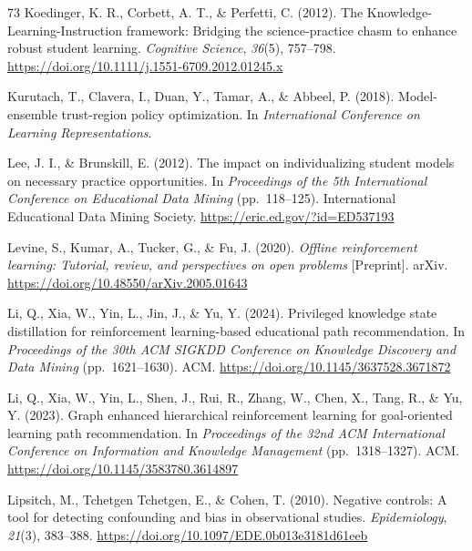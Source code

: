 \documentclass[a4paper,preprint,12pt,authoryear]{elsarticle}
\begin{document}
\begin{thebibliography}{73}
Koedinger, K. R., Corbett, A. T., \& Perfetti, C. (2012). The Knowledge-Learning-Instruction framework: Bridging the science-practice chasm to enhance robust student learning. \textit{Cognitive Science}, \textit{36}(5), 757--798. \url{https://doi.org/10.1111/j.1551-6709.2012.01245.x}

Kurutach, T., Clavera, I., Duan, Y., Tamar, A., \& Abbeel, P. (2018). Model-ensemble trust-region policy optimization. In \textit{International Conference on Learning Representations}.

Lee, J. I., \& Brunskill, E. (2012). The impact on individualizing student models on necessary practice opportunities. In \textit{Proceedings of the 5th International Conference on Educational Data Mining} (pp.~118--125). International Educational Data Mining Society. \url{https://eric.ed.gov/?id=ED537193}

Levine, S., Kumar, A., Tucker, G., \& Fu, J. (2020). \textit{Offline reinforcement learning: Tutorial, review, and perspectives on open problems} [Preprint]. arXiv. \url{https://doi.org/10.48550/arXiv.2005.01643}

Li, Q., Xia, W., Yin, L., Jin, J., \& Yu, Y. (2024). Privileged knowledge state distillation for reinforcement learning-based educational path recommendation. In \textit{Proceedings of the 30th ACM SIGKDD Conference on Knowledge Discovery and Data Mining} (pp.~1621--1630). ACM. \url{https://doi.org/10.1145/3637528.3671872}

Li, Q., Xia, W., Yin, L., Shen, J., Rui, R., Zhang, W., Chen, X., Tang, R., \& Yu, Y. (2023). Graph enhanced hierarchical reinforcement learning for goal-oriented learning path recommendation. In \textit{Proceedings of the 32nd ACM International Conference on Information and Knowledge Management} (pp.~1318--1327). ACM. \url{https://doi.org/10.1145/3583780.3614897}

Lipsitch, M., Tchetgen Tchetgen, E., \& Cohen, T. (2010). Negative controls: A tool for detecting confounding and bias in observational studies. \textit{Epidemiology}, \textit{21}(3), 383--388. \url{https://doi.org/10.1097/EDE.0b013e3181d61eeb}


\end{thebibliography}
\end{document}
